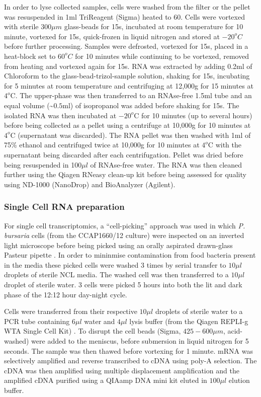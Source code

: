 In order to lyse collected samples, cells were washed from the filter or the 
pellet was resuspended in 1ml TriReagent (Sigma) heated to \(60\)\celsius. 
Cells were vortexed with sterile \(300\mu m\) glass-beads for 15s, incubated at 
room temperature for 10 minute, vortexed for 15s, quick-frozen in liquid 
nitrogen and stored at \(-20^{o}C\) before further processing.  
Samples were defrosted, vortexed for 15s, placed in a heat-block set 
to \(60^{o}C\) for 10 minutes while continuing to be vortexed, removed from 
heating and vortexed again for 15s.  
RNA was extracted by adding 0.2ml of Chloroform to the glass-bead-trizol-sample 
solution, shaking for 15s, incubating for 5 minutes at room temperature and 
centrifuging at 12,000g for 15 minutes at $4^{o}$C.  
The upper-phase was then transferred to an RNAse-free 1.5ml tube and an 
equal volume (\textasciitilde$0.5$ml) of isopropanol was added before shaking for 15s.  
The isolated RNA was then incubated at $-20^{o}$C for 10 minutes 
(up to several hours) before being collected as a pellet using a centrifuge at 
10,000g for 10 minutes at $4^{o}$C (supernatant was discarded). 
The RNA pellet was then washed with 1ml of 75\% ethanol and centrifuged 
twice at 10,000g for 10 minutes at $4^{o}$C with the supernatant being 
discarded after each centrifugation.  
Pellet was dried before being resuspended in 100$\mu l$ of RNAse-free water.  
The RNA was then cleaned further using the Qiagen RNeasy clean-up kit 
before being assessed for quality using ND-1000 (NanoDrop) and BioAnalyzer (Agilent).


\subsubsection{Single Cell RNA preparation}

For single cell transcriptomics, a ``cell-picking'' approach was used in which
\textit{P. bursaria} cells (from the CCAP1660/12 culture) were inspected on an inverted light microscope 
before being picked using an orally aspirated drawn-glass Pasteur pipette \citep{Garcia-Cuetos2012}.
In order to mininmise contamination from food bacteria present in the media these picked cells
were washed 3 times by serial transfer to \(10\mu l\) droplets of sterile NCL media.
The washed cell was then transferred to a \(10\mu l\) droplet of sterile water.
3 cells were picked 5 hours into both the lit and dark phase of the 12:12 hour day-night cycle.

Cells were transferred from their respective \(10\mu l\) droplets of sterile water to
a PCR tube containing \(6\mu l\) water and \(4\mu l \) lysis buffer (from the Qiagen
REPLI-g WTA Single Cell Kit) \citep{Korfhage2015}. To disrupt the cell beads (Sigma, \(425-600\mu m\), acid-washed)
were added to the meniscus, before submersion in liquid nitrogen for 5 seconds.  The sample was 
then thawed before vortexing for 1 minute.  
mRNA was selectively amplified and reverse transcribed to cDNA using poly-A selection.  The cDNA
was then amplified using multiple displacement amplification and the amplified cDNA purified
using a QIAamp DNA mini kit eluted in \(100\mu l\) elution buffer.

